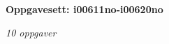 \centerline{\bf Oppgavesett: i00611no-i00620no}
\vskip 10pt
\centerline{\it 10 oppgaver}\vskip 10pt
\vskip 10pt
